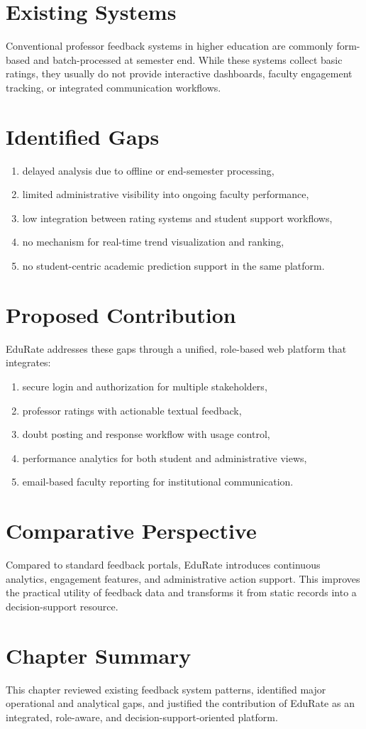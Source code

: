 \section{Existing Systems}
Conventional professor feedback systems in higher education are commonly form-based and batch-processed at semester end. While these systems collect basic ratings, they usually do not provide interactive dashboards, faculty engagement tracking, or integrated communication workflows.

\section{Identified Gaps}
\begin{enumerate}[label=\Alph*., leftmargin=1.5em]
    \item delayed analysis due to offline or end-semester processing,
    \item limited administrative visibility into ongoing faculty performance,
    \item low integration between rating systems and student support workflows,
    \item no mechanism for real-time trend visualization and ranking,
    \item no student-centric academic prediction support in the same platform.
\end{enumerate}

\section{Proposed Contribution}
EduRate addresses these gaps through a unified, role-based web platform that integrates:
\begin{enumerate}[label=\Alph*., leftmargin=1.5em]
    \item secure login and authorization for multiple stakeholders,
    \item professor ratings with actionable textual feedback,
    \item doubt posting and response workflow with usage control,
    \item performance analytics for both student and administrative views,
    \item email-based faculty reporting for institutional communication.
\end{enumerate}

\section{Comparative Perspective}
Compared to standard feedback portals, EduRate introduces continuous analytics, engagement features, and administrative action support. This improves the practical utility of feedback data and transforms it from static records into a decision-support resource.

\section*{Chapter Summary}
This chapter reviewed existing feedback system patterns, identified major operational and analytical gaps, and justified the contribution of EduRate as an integrated, role-aware, and decision-support-oriented platform.
